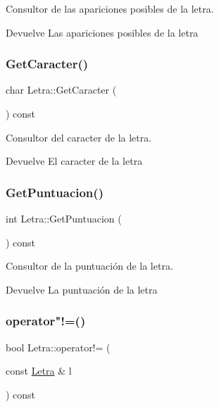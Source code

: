 Consultor de las apariciones posibles de la letra. 

\begin{DoxyReturn}{Devuelve}
Las apariciones posibles de la letra 
\end{DoxyReturn}
\mbox{\label{classLetra_a7459718d7d7eb8244372a6de96326152}} 
\subsubsection{\texorpdfstring{Get\+Caracter()}{GetCaracter()}}
{\footnotesize\ttfamily char Letra\+::\+Get\+Caracter (\begin{DoxyParamCaption}{ }\end{DoxyParamCaption}) const}



Consultor del caracter de la letra. 

\begin{DoxyReturn}{Devuelve}
El caracter de la letra 
\end{DoxyReturn}
\mbox{\label{classLetra_a074ee96643747004f1460c2450071d5e}} 
\subsubsection{\texorpdfstring{Get\+Puntuacion()}{GetPuntuacion()}}
{\footnotesize\ttfamily int Letra\+::\+Get\+Puntuacion (\begin{DoxyParamCaption}{ }\end{DoxyParamCaption}) const}



Consultor de la puntuación de la letra. 

\begin{DoxyReturn}{Devuelve}
La puntuación de la letra 
\end{DoxyReturn}
\mbox{\label{classLetra_aa9b95b0a0885994f0f7db4c4272dfe79}} 
\subsubsection{\texorpdfstring{operator"!=()}{operator!=()}}
{\footnotesize\ttfamily bool Letra\+::operator!= (\begin{DoxyParamCaption}\item[{const \hyperlink{classLetra}{Letra} \&}]{l }\end{DoxyParamCaption}) const}



